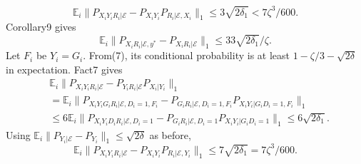 \[\mathbb E_i\|P_{X_iY_iR_i|\mathcal E}-P_{X_iY_i}P_{R_i|\mathcal E,X_i}\|_1\le3\sqrt{2\delta_1}<7\zeta^3/600.\tag{11}\]
Corollary9 gives
\[\mathbb E_i\|P_{X_iR_i|\mathcal E,y^*}-P_{X_iR_i|\mathcal E}\|_1\le33\sqrt{2\delta_1}/\zeta.\tag{12}\]
Let $F_i$ be $Y_i=G_i$. From(7), its conditional probability is at least $1-\zeta/3-\sqrt{2\delta}$ in expectation. Fact7 gives
\begin{align*}&\mathbb E_i\|P_{X_iY_iR_i|\mathcal E}-P_{Y_iR_i|\mathcal E}P_{X_i|Y_i}\|_1\\&=\mathbb E_i\|P_{X_iY_iG_iR_i|\mathcal E,D_i=1,F_i}-P_{G_iR_i|\mathcal E,D_i=1,F_i}P_{X_iY_i|G_iD_i=1,F_i}\|_1\\&\le6\mathbb E_i\|P_{X_iY_iD_iR_i|\mathcal E,D_i=1}-P_{G_iR_i|\mathcal E,D_i=1}P_{X_iY_i|G_iD_i=1}\|_1\le6\sqrt{2\delta_1}.\end{align*}
Using $\mathbb E_i\|P_{Y_i|\mathcal E}-P_{Y_i}\|_1\le\sqrt{2\delta}$ as before,
\[\mathbb E_i\|P_{X_iY_iR_i|\mathcal E}-P_{X_iY_i}P_{R_i|\mathcal E,Y_i}\|_1\le7\sqrt{2\delta_1}=7\zeta^3/600.\tag{13}\]
